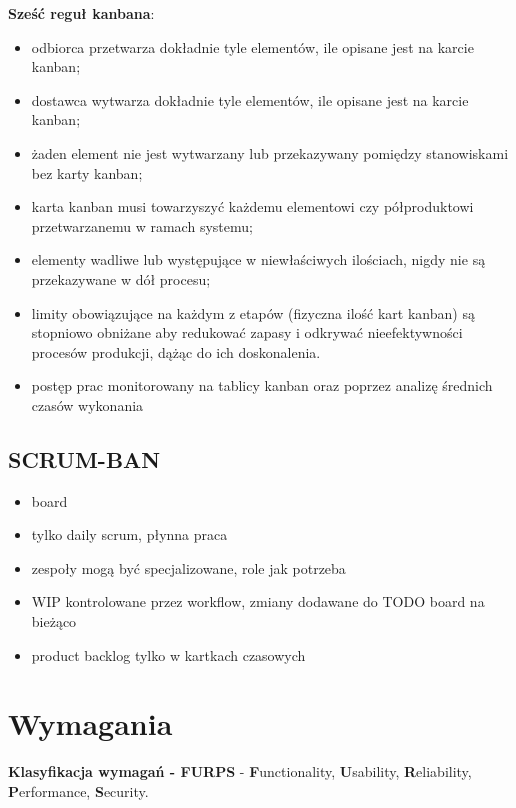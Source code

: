 \documentclass[a4paper]{article}
\begin{document}
    \textbf{Sześć reguł kanbana}:
    \begin{itemize}
        \item odbiorca przetwarza dokładnie tyle elementów, ile opisane jest na karcie kanban;
        \item dostawca wytwarza dokładnie tyle elementów, ile opisane jest na karcie kanban;
        \item żaden element nie jest wytwarzany lub przekazywany pomiędzy stanowiskami bez karty kanban;
        \item karta kanban musi towarzyszyć każdemu elementowi czy półproduktowi przetwarzanemu w ramach systemu;
        \item elementy wadliwe lub występujące w niewłaściwych ilościach, nigdy nie są przekazywane w dół procesu;
        \item limity obowiązujące na każdym z etapów (fizyczna ilość kart kanban) są stopniowo obniżane aby redukować zapasy i
        odkrywać nieefektywności procesów produkcji, dążąc do ich doskonalenia.
        \item postęp prac monitorowany na tablicy kanban oraz poprzez analizę średnich czasów wykonania\\
    \end{itemize}

    \subsection{SCRUM-BAN}
    \begin{itemize}
        \item board
        \item tylko daily scrum, płynna praca
        \item zespoły mogą być specjalizowane, role jak potrzeba
        \item WIP kontrolowane przez workflow, zmiany dodawane do TODO board na bieżąco
        \item product backlog tylko w kartkach czasowych
    \end{itemize}


    \section{Wymagania}
    \textbf{Klasyfikacja wymagań - FURPS} - \textbf{F}unctionality, \textbf{U}sability, \textbf{R}eliability,
    \textbf{P}erformance, \textbf{S}ecurity.
\end{document}
